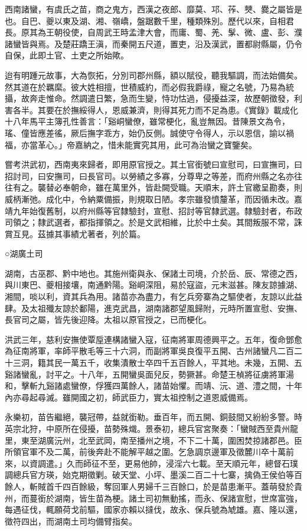 
\begin{pinyinscope}
西南諸蠻，有虞氏之苗，商之鬼方，西漢之夜郎、靡莫、邛、莋、僰、爨之屬皆是也。自巴、夔以東及湖、湘、嶺嶠，盤踞數千里，種類殊別。歷代以來，自相君長。原其為王朝役使，自周武王時孟津大會，而庸、蜀、羌、髳、微、盧、彭、濮諸蠻皆與焉。及楚莊蹻王滇，而秦開五尺道，置吏，沿及漢武，置都尉縣屬，仍令自保，此即土官、土吏之所始歟。

迨有明踵元故事，大為恢拓，分別司郡州縣，額以賦役，聽我驅調，而法始備矣。然其道在於羈縻。彼大姓相擅，世積威約，而必假我爵祿，寵之名號，乃易為統攝，故奔走惟命。然調遣日繁，急而生變，恃功怙過，侵擾益深，故歷朝徵發，利害各半。其要在於撫綏得人，恩威兼濟，則得其死力而不足為患。《實錄》載成化十八年馬平主簿孔性善言：「谿峒蠻僚，雖常梗化，亂豈無因。昔陳景文為令，瑤、僮皆應差徭，厥后撫字乖方，始仍反側。誠使守令得人，示以恩信，諭以禍福，亦當革心。」帝嘉納之，惜未能實究其用，此可為治蠻之寶鑒矣。

嘗考洪武初，西南夷來歸者，即用原官授之。其土官銜號曰宣慰司，曰宣撫司，曰招討司，曰安撫司，曰長官司。以勞績之多寡，分尊卑之等差，而府州縣之名亦往往有之。襲替必奉朝命，雖在萬里外，皆赴闕受職。天順末，許土官繳呈勘奏，則威柄漸弛。成化中，令納粟備振，則規取日陋。孝宗雖發憤釐革，而因循未改。嘉靖九年始復舊制，以府州縣等官隸驗封，宣慰、招討等官隸武選。隸驗封者，布政司領之；隸武選者，都指揮領之。於是文武相維，比於中土矣。其間叛服不常，誅賞互見。茲據其事績尤著者，列於篇。

○湖廣土司

湖南，古巫郡、黔中地也。其施州衛與永、保諸土司境，介於岳、辰、常德之西，與川東巴、夔相接壤，南通黔陽。谿峒深阻，易於寇盜，元末滋甚。陳友諒據湖、湘間，啖以利，資其兵為用。諸苗亦為盡力，有乞兵旁寨為之驅使者，友諒以此益肆。及太祖殲友諒於鄱陽，進克武昌，湖南諸郡望風歸附，元時所置宣慰、安撫、長官司之屬，皆先後迎降。太祖以原官授之，已而梗化。

洪武三年，慈利安撫使覃垕連構諸蠻入寇，征南將軍周德興平之。五年，復命鄧愈為征南將軍，率師平散毛等三十六洞，而副將軍吳良復平五開、古州諸蠻凡二百二十三洞，籍其民一萬五千，收集潰散士卒四千五百餘人，平其地。未幾，五開、五谿諸蠻亂，討平之。十八年，五開蠻吳面兒反，勢獗甚。命楚王楨將征虜將軍湯和，擊斬九谿諸處蠻僚，俘獲四萬餘人，諸苗始懼。而靖、沅、道、澧之間，十年內亦尋起尋滅。雖開國之初，師武臣力，實太祖控制之道恩威備焉。

永樂初，苗告繼絕，襲冠帶，益就銜勒。垂百年，而五開、銅鼓間又紛紛多警。時英宗北狩，中原所在侵擾，苗勢殊熾。景泰初，總兵官宮聚奏：「蠻賊西至貴州龍里，東至湖廣沅州，北至武岡，南至播州之境，不下二十萬，圍困焚掠諸郡邑。臣所領官軍不及二萬，前後奔赴不能解平越之圍。乞急調京邊軍及徵麓川卒十萬前來，以資調遣。」久而師征不至，更易他帥，浸淫六七載。至天順元年，總督石璞調總兵官方瑛，始克期徵剿。破天堂、小坪、墨溪二百二十七寨，擒偽王侯伯等百餘人，斬賊首千四百餘級，奪回軍人男婦千三百餘口，於是苗患漸平。蓋萌發於貴州，而蔓銜於湖南，皆生苗為梗。諸土司初無動搖，而永、保諸宣慰，世席富強，每遇征伐，輒願荷戈前驅，國家亦賴以撻伐，故永、保兵號為虓雄。嘉、隆以還，徵符四出，而湖南土司均備臂指矣。


\end{pinyinscope}
